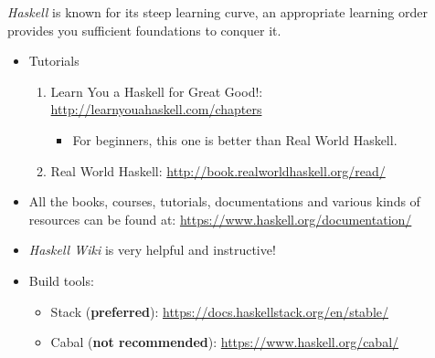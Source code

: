 \documentclass{article}
\begin{document}
\begin{itemize}
    \emph{Haskell} is known for its steep learning curve, an appropriate learning order provides you sufficient foundations to conquer it.
    \begin{itemize}
        \item Tutorials
        \begin{enumerate}
            \item Learn You a Haskell for Great Good!:
            \href{http://learnyouahaskell.com/chapters}{http://learnyouahaskell.com/chapters}
            \begin{itemize}
                \item For beginners, this one is better than Real World Haskell.
            \end{itemize}
            \item Real World Haskell:
            \href{http://book.realworldhaskell.org/read/}{http://book.realworldhaskell.org/read/}
        \end{enumerate}
        \item All the books, courses, tutorials, documentations and various kinds of resources can be found at:
        \href{https://www.haskell.org/documentation/}{https://www.haskell.org/documentation/}
        \item \emph{Haskell Wiki} is very helpful and instructive!
        \item Build tools:
        \begin{itemize}
            \item Stack (\textbf{preferred}):
            \href{https://docs.haskellstack.org/en/stable/}{https://docs.haskellstack.org/en/stable/}
            \item Cabal (\textbf{not recommended}):
            \href{https://www.haskell.org/cabal/}{https://www.haskell.org/cabal/}
            

\end{itemize}
\end{itemize}
\end{itemize}
\end{document}
